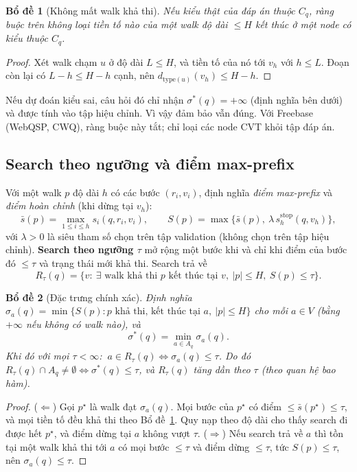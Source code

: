 \documentclass[11pt,a4paper]{article}
\newtheorem{lemma}{Bổ đề}
\theoremstyle{remark}
\newcommand{\Aq}{A_q}
\newcommand{\sbar}{\bar{s}}
\begin{document}
\begin{lemma}[Không mất walk khả thi]\label{lem:feas}
Nếu kiểu thật của đáp án thuộc $C_q$, ràng buộc trên không loại tiền tố nào của một walk độ dài $\le H$ kết thúc ở một node có kiểu thuộc $C_q$.
\end{lemma}
\begin{proof}
Xét walk chạm $u$ ở độ dài $L\le H$, và tiền tố của nó tới $v_h$ với $h\le L$. Đoạn còn lại có $L-h\le H-h$ cạnh, nên $d_{\mathrm{type}(u)}(v_h)\le H-h$.
\end{proof}
\noindent Nếu dự đoán kiểu sai, câu hỏi đó chỉ nhận $\sigma^*(q)=+\infty$ (định nghĩa bên dưới) và được tính vào tập hiệu chỉnh. Vì vậy đảm bảo vẫn đúng. Với Freebase (WebQSP, CWQ), ràng buộc này tắt; chỉ loại các node CVT khỏi tập đáp án.

\subsection{Search theo ngưỡng và điểm max-prefix}
Với một walk $p$ độ dài $h$ có các bước $(r_i,v_i)$, định nghĩa \emph{điểm max-prefix} và \emph{điểm hoàn chỉnh} (khi dừng tại $v_h$):
\begin{equation}
\sbar(p)=\max_{1\le i\le h}s_i(q,r_i,v_i),\qquad
S(p)=\max\big\{\sbar(p),\ \lambda\, s^{\mathrm{stop}}_h(q,v_h)\big\},
\end{equation}
với $\lambda>0$ là siêu tham số chọn trên tập validation (không chọn trên tập hiệu chỉnh). \textbf{Search theo ngưỡng $\tau$} mở rộng một bước khi và chỉ khi điểm của bước đó $\le\tau$ và trạng thái mới khả thi. Search trả về
\[
R_\tau(q)=\{v:\ \exists\text{ walk khả thi } p \text{ kết thúc tại } v,\ |p|\le H,\ S(p)\le\tau\}.
\]

\begin{lemma}[Đặc trưng chính xác]\label{lem:exact}
Định nghĩa $\sigma_a(q)=\min\{S(p): p \text{ khả thi, kết thúc tại } a,\ |p|\le H\}$ cho mỗi $a\in V$ (bằng $+\infty$ nếu không có walk nào), và
\[
\sigma^*(q)=\min_{a\in\Aq}\sigma_a(q).
\]
Khi đó với mọi $\tau<\infty$: $\ a\in R_\tau(q)\iff\sigma_a(q)\le\tau$. Do đó $R_\tau(q)\cap\Aq\neq\emptyset\iff\sigma^*(q)\le\tau$, và $R_\tau(q)$ tăng dần theo $\tau$ (theo quan hệ bao hàm).
\end{lemma}
\begin{proof}
($\Leftarrow$) Gọi $p^\star$ là walk đạt $\sigma_a(q)$. Mọi bước của $p^\star$ có điểm $\le\sbar(p^\star)\le\tau$, và mọi tiền tố đều khả thi theo Bổ đề~\ref{lem:feas}. Quy nạp theo độ dài cho thấy search đi được hết $p^\star$, và điểm dừng tại $a$ không vượt $\tau$. ($\Rightarrow$) Nếu search trả về $a$ thì tồn tại một walk khả thi tới $a$ có mọi bước $\le\tau$ và điểm dừng $\le\tau$, tức $S(p)\le\tau$, nên $\sigma_a(q)\le\tau$.
\end{proof}
\end{document}
